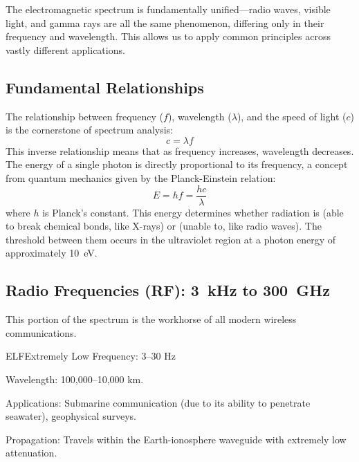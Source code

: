 \begin{keyconcept}
    The electromagnetic spectrum is fundamentally unified---radio waves, visible light, and gamma rays are all the same phenomenon, differing only in their frequency and wavelength. This allows us to apply common principles across vastly different applications.
\end{keyconcept}

\subsection{Fundamental Relationships}

The relationship between frequency ($f$), wavelength ($\lambda$), and the speed of light ($c$) is the cornerstone of spectrum analysis:
\begin{equation}
    c = \lambda f
    \label{eq:wavelength}
\end{equation}
This inverse relationship means that as frequency increases, wavelength decreases. The energy of a single photon is directly proportional to its frequency, a concept from quantum mechanics given by the Planck-Einstein relation:
\begin{equation}
    E = h f = \frac{hc}{\lambda}
\end{equation}
where $h$ is Planck's constant. This energy determines whether radiation is  (able to break chemical bonds, like X-rays) or  (unable to, like radio waves). The threshold between them occurs in the ultraviolet region at a photon energy of approximately 10~eV.

\subsection{Radio Frequencies (RF): \qty{3}{kHz} to \qty{300}{GHz}}

This portion of the spectrum is the workhorse of all modern wireless communications.

\begin{spectrumband}{ELF}{Extremely Low Frequency: 3--30 Hz}
    \item[Wavelength:] 100,000--10,000 km.
    \item[Applications:] Submarine communication (due to its ability to penetrate seawater), geophysical surveys.
    \item[Propagation:] Travels within the Earth-ionosphere waveguide with extremely low attenuation.
\end{spectrumband}

